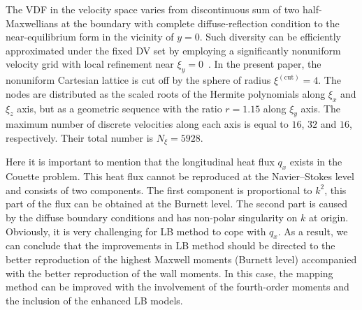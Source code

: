 \documentclass{elsarticle} %
\begin{document}
The VDF in the velocity space varies from discontinuous sum of two half-Maxwellians at the boundary
with complete diffuse-reflection condition to the near-equilibrium form in the vicinity of \(y=0\).
Such diversity can be efficiently approximated under the fixed DV set by employing
a significantly nonuniform velocity grid with local refinement near \(\xi_y=0\)~\cite{Ohwada1990, Wu2014, Rogozin2016}.
In the present paper, the nonuniform Cartesian lattice is cut off by the sphere of radius \(\xi^{(\mathrm{cut})}=4\).
The nodes are distributed as the scaled roots of the Hermite polynomials along \(\xi_x\) and \(\xi_z\) axis,
but as a geometric sequence with the ratio \(r = 1.15\) along \(\xi_y\) axis.
The maximum number of discrete velocities along each axis is equal to \(16\), \(32\) and \(16\), respectively.
Their total number is \(N_\xi=5928\).

Here it is important to mention that the longitudinal heat flux $q_x$ exists in the Couette problem.
This heat flux cannot be reproduced at the Navier--Stokes level and consists of two components.
The first component is proportional to $k^2$, this part of the flux can be obtained at the Burnett level.
The second part is caused by the diffuse boundary conditions and has non-polar singularity on $k$ at origin.
Obviously, it is very challenging for LB method to cope with $q_x$.
As a result, we can conclude that the improvements in LB method should be directed
to the better reproduction of the highest Maxwell moments (Burnett level)
accompanied with the better reproduction of the wall moments.
In this case, the mapping method can be improved with the involvement of the fourth-order moments
and the inclusion of the enhanced LB models.
\end{document}

